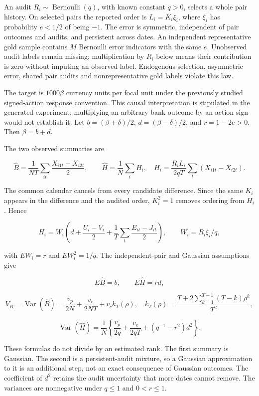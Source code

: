 An audit \(R_i\sim\operatorname{Bernoulli}(q)\), with known constant
\(q>0\), selects a whole pair history. On selected pairs the reported
order is \(L_i=K_i\xi_i\), where \(\xi_i\) has probability \(e<1/2\) of
being \(-1\). The error is symmetric, independent of pair outcomes and
audits, and persistent across dates. An independent representative gold
sample contains \(M\) Bernoulli error indicators with the same \(e\).
Unobserved audit labels remain missing; multiplication by \(R_i\) below
means their contribution is zero without imputing an observed label.
Endogenous selection, asymmetric error, shared pair audits and
nonrepresentative gold labels violate this law.

The target is \(1000\beta\) currency units per focal unit under the
previously studied signed-action response convention. This causal
interpretation is stipulated in the generated experiment; multiplying an
arbitrary bank outcome by an action sign would not establish it. Let
\(b=(\beta+\delta)/2\), \(d=(\beta-\delta)/2\), and \(r=1-2e>0\). Then
\(\beta=b+d\).

The two observed summaries are

\[
 \widehat B=\frac1{NT}\sum_{it}\frac{X_{i1t}+X_{i2t}}2,
 \qquad
 \widehat H=\frac1N\sum_i H_i,
 \quad
 H_i=\frac{R_iL_i}{2qT}\sum_t(X_{i1t}-X_{i2t}).
\]

The common calendar cancels from every candidate difference. Since the
same \(K_i\) appears in the difference and the audited order,
\(K_i^2=1\) removes ordering from \(H_i\). Hence

\[
 H_i=W_i\left(d+\frac{U_i-V_i}{2}
                    +\frac1T\sum_t\frac{E_{it}-J_{it}}2\right),
 \qquad W_i=R_i\xi_i/q,
\]

with \(E W_i=r\) and \(E W_i^2=1/q\). The independent-pair and Gaussian
assumptions give

\[
 E\widehat B=b,\qquad E\widehat H=rd,
\]

\[
 V_B=\operatorname{Var}(\widehat B)
   =\frac{v_p}{2N}+\frac{v_e}{2NT}+v_c k_T(\rho),
 \quad
 k_T(\rho)=\frac{T+2\sum_{k=1}^{T-1}(T-k)\rho^k}{T^2},
\]

\[
 \operatorname{Var}(\widehat H)
 =\frac1N\left\{\frac{v_p}{2q}+\frac{v_e}{2qT}
                       +(q^{-1}-r^2)d^2\right\}.
\]

These formulas do not divide by an estimated rank. The first summary is
Gaussian. The second is a persistent-audit mixture, so a Gaussian
approximation to it is an additional step, not an exact consequence of
Gaussian outcomes. The coefficient of \(d^2\) retains the audit
uncertainty that more dates cannot remove. The variances are nonnegative
under \(q\leq1\) and \(0<r\leq1\).

